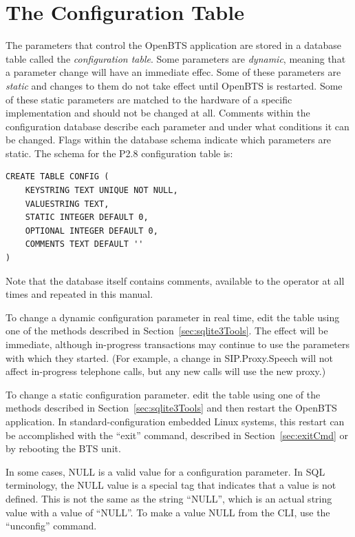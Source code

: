 \documentclass[11pt,openany]{book}
\begin{document}
\section{The Configuration Table}
\label{sec:configTable}
The parameters that control the OpenBTS application are stored in a database table called the \emph{configuration table}.  Some parameters are \emph{dynamic}, meaning that a parameter change will have an immediate effec.  Some of these parameters are \emph{static} and changes to them do not take effect until OpenBTS is restarted.  Some of these static parameters are matched to the hardware of a specific implementation and should not be changed at all.  Comments within the configuration database describe each parameter and under what conditions it can be changed.
Flags within the database schema indicate which parameters are static.
The schema for the P2.8 configuration table is:
\begin{verbatim}
CREATE TABLE CONFIG (
    KEYSTRING TEXT UNIQUE NOT NULL, 
    VALUESTRING TEXT, 
    STATIC INTEGER DEFAULT 0, 
    OPTIONAL INTEGER DEFAULT 0, 
    COMMENTS TEXT DEFAULT ''
)
\end{verbatim}

Note that the database itself contains comments, available to the operator at all times and repeated in this manual.

To change a dynamic configuration parameter in real time, edit the table using one of the methods described in Section~\ref{sec:sqlite3Tools}.  The effect will be immediate, although in-progress transactions may continue to use the parameters with which they started.  (For example, a change in SIP.Proxy.Speech will not affect in-progress telephone calls, but any new calls will use the new proxy.)

To change a static configuration parameter. edit the table using one of the methods described in Section~\ref{sec:sqlite3Tools} and then restart the OpenBTS application.
In standard-configuration embedded Linux systems, this restart can be accomplished with the ``exit'' command, described in Section~\ref{sec:exitCmd} or by rebooting the BTS unit.

In some cases, NULL is a valid value for a configuration parameter.  In SQL terminology, the NULL value is a special tag that indicates that a value is not defined.  This is not the same as the string ``NULL'', which is an actual string value with a value of ``NULL''.  To make a value NULL from the CLI, use the ``unconfig'' command.
\end{document}
